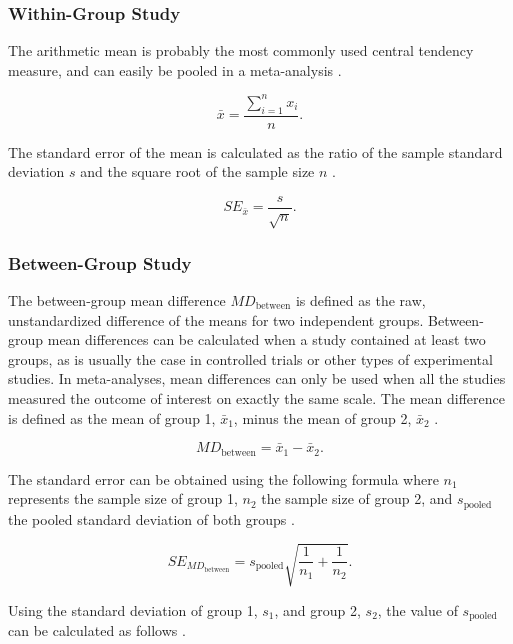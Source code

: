 \documentclass[../../../main.tex]{subfiles}
\begin{document}
\subsubsection{Within-Group Study}

The arithmetic mean is probably the most commonly used central tendency measure, and can easily be pooled in a meta-analysis \autocite{Harrer2021}.

\begin{equation}
\bar{x} = \frac{\sum_{i=1}^{n}x_i}{n}.
\end{equation}

The standard error of the mean is calculated as the ratio of the sample standard deviation $s$ and the square root of the sample size $n$ \autocite{Harrer2021}.

\begin{equation}
SE_{\bar{x}} = \frac{s}{\sqrt{n}}.
\end{equation}

\subsubsection{Between-Group Study}

The between-group mean difference $MD_{\text{between}}$ is defined as the raw, unstandardized difference of the means for two independent groups. Between-group mean differences can be calculated when a study contained at least two groups, as is usually the case in controlled trials or other types of experimental studies. In meta-analyses, mean differences can only be used when all the studies measured the outcome of interest on exactly the same scale. The mean difference is defined as the mean of group 1, $\bar{x}_1$, minus the mean of group 2, $\bar{x}_2$ \autocite{Harrer2021}.

\begin{equation}
MD_{\text{between}} = \bar{x}_1 - \bar{x}_2.
\end{equation}

The standard error can be obtained using the following formula where $n_1$ represents the sample size of group 1, $n_2$ the sample size of group 2, and $s_{\text{pooled}}$ the pooled standard deviation of both groups \autocite{Harrer2021}.

\begin{equation}
SE_{MD_\text{between}} = s_{\text{pooled}}\sqrt{\frac{1}{n_1}+\frac{1}{n_2}}.
\end{equation}

Using the standard deviation of group 1, $s_1$, and group 2, $s_2$, the value of $s_\text{pooled}$ can be calculated as follows \autocite{Harrer2021}.
\end{document}
